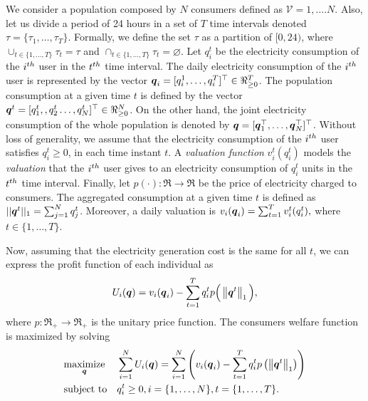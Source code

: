 We consider a population composed by $N$ consumers defined as $\mathcal{V} = {1,\ldots.N}$. Also, let us divide a period of 24 hours in a set of $T$ time intervals denoted $\tau = \{\tau_1,\ldots,\tau_T\}$.
Formally, we define the set $\tau$ as a partition of $[0,24)$, where 
 $\cup_{t\in\{1,\ldots,T\}} \tau_t = \tau$ and $\cap_{t\in\{1,\ldots,T\}} \tau_t = \varnothing$.
%
Let $q_i^t$ be the electricity consumption of the $i^{th}$ user in the $t^{th}$ time interval. 
The daily electricity consumption of the $i^{th}$ user is represented by the vector $\boldsymbol{q}_i=[q_i^1,\ldots,q_i^T]^\top\in \Re_{\geq 0}^{T}$.
The population consumption at a given time $t$ is defined by the vector $\boldsymbol{q}^t = [q_1^t,, q_2^t\ldots,q_N^t]^\top\in \Re_{\geq 0}^{N}$.
On the other hand, the joint electricity consumption of the whole population is denoted by $\boldsymbol{q} = [\boldsymbol{q}_1^\top,
\ldots, \boldsymbol{q}_N^\top]^\top$. 
Without loss of generality, we assume that the electricity consumption of the $i^{th}$ user  satisfies $q_i^t\geq 0$,  in each time instant $t$.
A \emph{valuation function} $v_i^t(q_i^t)$ models the \emph{valuation} that the $i^{th}$ user gives to an electricity consumption of $q_i^t$ units in the $t^{th}$ time interval. Finally, let $p(\cdot):\Re\rightarrow\Re$ be the price of electricity charged to consumers. The aggregated consumption at a given time $t$ is defined as $||\boldsymbol{q}^t||_1 = \sum_{j=1}^N q_j^t$.
Moreover, a daily valuation is 
$v_i(\boldsymbol{q}_i)=\sum_{t=1}^T v_i^t(q_i^t),$
 where $t\in\{1,\ldots,T\}$.


 
 
 
Now, assuming  that the electricity generation cost is  the same for all $t$, we can express the profit function of each individual as
%
\begin{equation}\label{eq:u_i_}
 U_i(\boldsymbol{q}) = v_i(\boldsymbol{q}_i) - \sum_{t=1}^T q_i^t p\Big( \left\lVert\boldsymbol{q}^t\right\rVert_1 \Big),
\end{equation}
%
where 
$p:\Re_+ \to \Re_+$ is the unitary price function.
The consumers welfare function is maximized by solving \cite{Johari09}
%
\begin{equation}\label{eq:opt_problem}
\begin{aligned}
& \underset{\boldsymbol{q}}{\text{maximize}}
& &  \sum_{i=1}^N U_i(\boldsymbol{q}) =  \sum_{i=1}^N\left( v_i(\boldsymbol{q}_i) - \sum_{t=1}^T q_i^t p\left( \left\lVert\boldsymbol{q}^t\right\rVert_1 \right) \right) \\
& \text{subject to}
& & q_i^t \geq 0,  i =\{1,\ldots,N\}, t =\{1,\ldots,T\}.
\end{aligned}
\end{equation}



